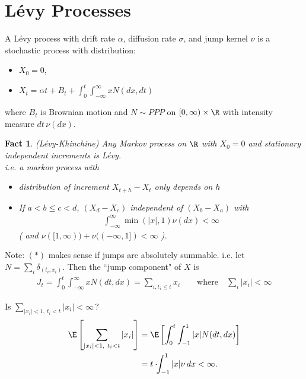 \documentclass[12pt]{article}
\newtheorem{fact}[thm]{Fact}
\begin{document}

\section{L\'evy  Processes}

\begin{defn}
A L\'evy  process  with drift rate $\alpha$, diffusion rate $\sigma$, and jump kernel $\nu$ is a stochastic process with distribution: 
\begin{itemize}
\item[\ ] $X_0 = 0$,
\item[$(*)$] $X_t = \alpha t + B_t + \int_0^t \int_{-\infty}^\infty xN(dx, dt)$
\end{itemize}
where $B_t$ is Brownian motion and $N \sim PPP$ on $[0, \infty) \times \R$ with intensity measure $dt \,\nu(dx)$.
\end{defn}

\begin{fact}
(L\'evy-Khinchine)
Any Markov process on $\R$ with $X_0 = 0$ and stationary independent increments is L\'evy. \\

\noindent i.e. a markov process with 
\begin{itemize}
\item[(a)] distribution of increment $X_{t+h} - X_t$ only depends on $h$
\item[(b)] If $a < b \leq c < d$,
$(X_d - X_c)$ independent of $(X_b - X_a)$ with 
$$\begin{aligned}
\int_{-\infty}^\infty \min(|x|, 1) \nu(dx) < \infty
\end{aligned}$$
\big( and $\nu([1,\infty)) + \nu((-\infty,1]) < \infty$ \big).
\end{itemize}
\end{fact}

\noindent
Note: $(*)$ makes sense if jumps are absolutely summable. 
i.e. let $N = \sum_i \delta_{(t_i, x_i)}$. Then the ``jump component" of $X$ is 
$$\begin{aligned}
J_t = \int_0^t \int_{-\infty}^\infty xN(dt,dx) = \sum_{i, t_i \leq t} x_i \qquad \text{where} \quad \sum_i |x_i| < \infty
\end{aligned}$$

\noindent Is $\sum_{|x_i| < 1,\ t_i < t} |x_i| < \infty\,?$
$$\begin{aligned}
\E\left[ \sum_{|x_i| < 1,\ t_i < t} |x_i| \right] 
	&= \E \left[ \int_0^t \int_{-1}^1 |x|N(dt,dx) \right] \\
	&= t \cdot\!\! \int_{-1}^1 |x| \nu\, dx < \infty.
\end{aligned}$$
\end{document}
